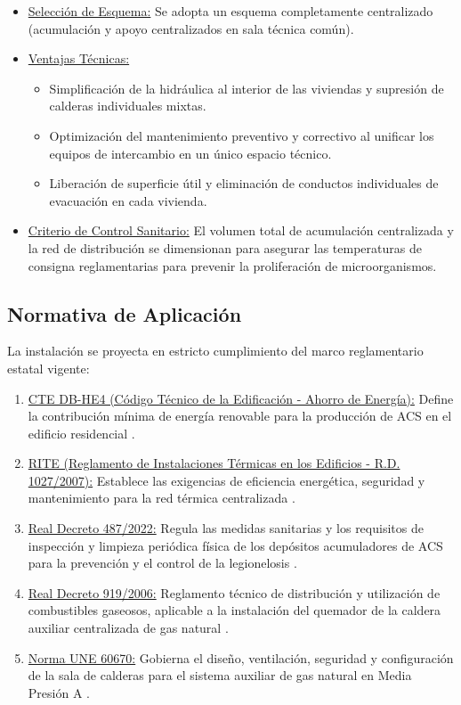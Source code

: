 \documentclass[12pt]{article}
\begin{document}
\begin{itemize}
    \item \uline{Selección de Esquema:} Se adopta un esquema completamente centralizado (acumulación y apoyo centralizados en sala técnica común).
    \item \uline{Ventajas Técnicas:} 
    \begin{itemize}
        \item Simplificación de la hidráulica al interior de las viviendas y supresión de calderas individuales mixtas.
        \item Optimización del mantenimiento preventivo y correctivo al unificar los equipos de intercambio en un único espacio técnico.
        \item Liberación de superficie útil y eliminación de conductos individuales de evacuación en cada vivienda.
    \end{itemize}
    \item \uline{Criterio de Control Sanitario:} El volumen total de acumulación centralizada y la red de distribución se dimensionan para asegurar las temperaturas de consigna reglamentarias para prevenir la proliferación de microorganismos.
\end{itemize}

\subsection{Normativa de Aplicación}
\label{subsec:normativa_aplicacion}

La instalación se proyecta en estricto cumplimiento del marco reglamentario estatal vigente:

\begin{enumerate}
    \item \uline{CTE DB-HE4 (Código Técnico de la Edificación - Ahorro de Energía):} Define la contribución mínima de energía renovable para la producción de ACS en el edificio residencial \cite{cte_he4}.
    \item \uline{RITE (Reglamento de Instalaciones Térmicas en los Edificios - R.D. 1027/2007):} Establece las exigencias de eficiencia energética, seguridad y mantenimiento para la red térmica centralizada \cite{rite}.
    \item \uline{Real Decreto 487/2022:} Regula las medidas sanitarias y los requisitos de inspección y limpieza periódica física de los depósitos acumuladores de ACS para la prevención y el control de la legionelosis \cite{rd487_2022}.
    \item \uline{Real Decreto 919/2006:} Reglamento técnico de distribución y utilización de combustibles gaseosos, aplicable a la instalación del quemador de la caldera auxiliar centralizada de gas natural \cite{rd919_2006}.
    \item \uline{Norma UNE 60670:} Gobierna el diseño, ventilación, seguridad y configuración de la sala de calderas para el sistema auxiliar de gas natural en Media Presión A \cite{une60670}.
\end{enumerate}
\end{document}
